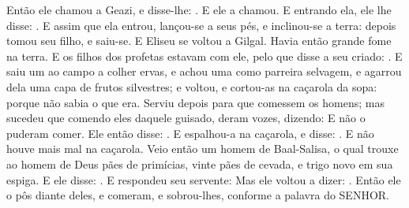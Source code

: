 {  Então ele chamou a Geazi, e disse-lhe: . E ele a chamou. E entrando ela, ele lhe disse: .
  E assim que ela entrou, lançou-se a seus pés, e inclinou-se a terra: depois tomou seu filho, e saiu-se.
  E Eliseu se voltou a Gilgal. Havia então grande fome na terra. E os filhos dos profetas estavam com ele, pelo que disse a seu criado: .
  E saiu um ao campo a colher ervas, e achou uma como parreira selvagem, e agarrou dela uma capa de frutos silvestres; e voltou, e cortou-as na caçarola da sopa: porque não sabia o que era.
  Serviu depois para que comessem os homens; mas sucedeu que comendo eles daquele guisado, deram vozes, dizendo:  E não o puderam comer.
  Ele então disse: . E espalhou-a na caçarola, e disse: . E não houve mais mal na caçarola.
  Veio então um homem de Baal-Salisa, o qual trouxe ao homem de Deus pães de primícias, vinte pães de cevada, e trigo novo em sua espiga. E ele disse: .
  E respondeu seu servente:  Mas ele voltou a dizer: .
  Então ele o pôs diante deles, e comeram, e sobrou-lhes, conforme a palavra do SENHOR.
\par }

